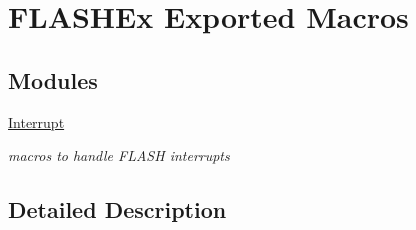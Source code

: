 \hypertarget{group___f_l_a_s_h_ex___exported___macros}{}\section{F\+L\+A\+S\+H\+Ex Exported Macros}
\label{group___f_l_a_s_h_ex___exported___macros}
\subsection*{Modules}
\begin{DoxyCompactItemize}
\item 
\hyperlink{group___f_l_a_s_h___interrupt}{Interrupt}
\begin{DoxyCompactList}\small\item\em macros to handle F\+L\+A\+SH interrupts \end{DoxyCompactList}\end{DoxyCompactItemize}


\subsection{Detailed Description}

